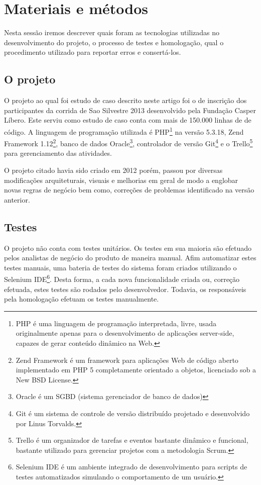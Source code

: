 \documentclass[11pt, a4paper]{article}
\begin{document}
\section{Materiais e métodos}
Nesta sessão iremos descrever quais foram as tecnologias utilizadas no desenvolvimento do projeto, o processo de testes e homologação, qual o procedimento utilizado para reportar erros e consertá-los.

\subsection{O projeto}
O projeto ao qual foi estudo de caso descrito neste artigo foi o de inscrição dos participantes da corrida de Sao Silvestre 2013 desenvolvido pela Fundação Casper Líbero. Este serviu como estudo de caso conta com mais de 150.000 linhas de de código. A linguagem de programação utilizada é PHP\footnote{PHP é uma linguagem de programação interpretada, livre, usada originalmente apenas para o desenvolvimento de aplicações server-side, capazes de gerar conteúdo dinâmico na Web.} na versão 5.3.18, Zend Framework 1.12\footnote{Zend Framework é um framework para aplicações Web de código aberto implementado em PHP 5 completamente orientado a objetos,  licenciado sob a New BSD License.}, banco de dados Oracle\footnote{Oracle é um SGBD (sistema gerenciador de banco de dados)}, controlador de versão Git\footnote{Git é um sistema de controle de versão distribuído projetado e desenvolvido por Linus Torvalds.} e o Trello\footnote{Trello é um organizador de tarefas e eventos bastante dinâmico e funcional, bastante utilizado para gerenciar projetos com a metodologia Scrum.} para gerenciamento das atividades.

O projeto citado havia sido criado em 2012 porém, passou por diversas modificações arquiteturais, visuais e melhorias em geral de modo a englobar novas regras de negócio bem como, correções de problemas identificado na versão anterior.

\subsection{Testes}
O projeto não conta com testes unitários. Os testes em sua maioria são efetuado pelos analistas de negócio do produto de maneira manual. Afim automatizar estes testes manuais, uma bateria de testes do sistema foram criados utilizando o Selenium IDE\footnote{Selenium IDE é um ambiente integrado de desenvolvimento para scripts de testes automatizados simulando o comportamento de um usuário.}. Desta forma, a cada nova funcionalidade criada ou, correção efetuada, estes testes são rodados pelo desenvolvedor. Todavia, os responsáveis pela homologação efetuam os testes manualmente.
\end{document}
